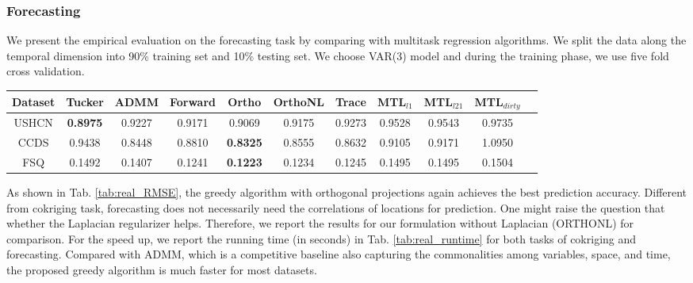 
\subsubsection{Forecasting}
We present the empirical evaluation on the forecasting task by comparing with multitask regression algorithms.  We split the data along the temporal dimension into 90\% training set and 10\% testing set. We choose VAR(3) model and during the training phase, we use five fold cross validation.%

\begin{table*}[t]
\caption{ Forecasting NRMSE for VAR process with 3 lags, trained with 90\%  of the time series.} %
\small
\label{tab:real_RMSE}
\begin{center}
\begin{tiny}
\begin{sc}
\centering  \footnotesize%
\begin{tabular}{@{}c@{\;\;} c @{\;\;} c @{\;\;}c @{\;\;}c@{\;\;} c @{\;\;}c@{\;\;} c @{\;\;}c @{\;\;}c @{\;\;}c@{}} %
\hline
Dataset  & Tucker  & ADMM & Forward & Ortho & OrthoNL& Trace  & MTL$_{l1}$ & MTL$_{l21}$ & MTL$_{dirty}$  \\
\hline
USHCN  & \textbf{0.8975} & 0.9227& 0.9171& 0.9069 & 0.9175 & 0.9273& 0.9528   & 0.9543 &  0.9735  \\
CCDS & 0.9438 & 0.8448 & 0.8810& \textbf{0.8325} &0.8555 &0.8632 & 0.9105& 0.9171& 1.0950 \\
FSQ  & 0.1492 & 0.1407& 0.1241& \textbf{0.1223} & 0.1234 &0.1245 &  0.1495 &  0.1495   & 0.1504  \\
\hline
\end{tabular}
\end{sc}
\end{tiny}
\end{center}
\vspace{-0.25in}
\end{table*}


As shown in Tab. \ref{tab:real_RMSE}, the greedy algorithm with orthogonal projections again achieves the best prediction accuracy. Different from cokriging task, forecasting does not necessarily need the correlations of locations for prediction. One might raise the question that whether the Laplacian regularizer helps. Therefore, we report the results for our formulation without Laplacian (ORTHONL) for comparison.  For the speed up, we report the running time (in seconds) in Tab. \ref{tab:real_runtime} for both tasks of cokriging and forecasting.  Compared with ADMM, which is a competitive baseline also capturing the commonalities among variables, space, and time, the proposed greedy algorithm is much faster for most datasets.

